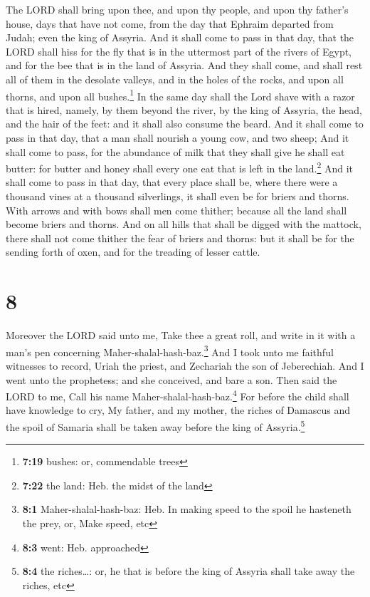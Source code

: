  The LORD shall bring upon thee, and upon thy people, and
upon thy father's house, days that have not come, from the day that
Ephraim departed from Judah; even the king of Assyria. 
And it shall come to pass in that day, that the LORD shall hiss for the
fly that is in the uttermost part of the rivers of Egypt, and for the
bee that is in the land of Assyria.  And they shall come,
and shall rest all of them in the desolate valleys, and in the holes of
the rocks, and upon all thorns, and upon all bushes.\footnote{\textbf{7:19}
  bushes: or, commendable trees}  In the same day shall
the Lord shave with a razor that is hired, namely, by them beyond the
river, by the king of Assyria, the head, and the hair of the feet: and
it shall also consume the beard.  And it shall come to
pass in that day, that a man shall nourish a young cow, and two sheep;
 And it shall come to pass, for the abundance of milk
that they shall give he shall eat butter: for butter and honey shall
every one eat that is left in the land.\footnote{\textbf{7:22} the land:
  Heb. the midst of the land}  And it shall come to pass
in that day, that every place shall be, where there were a thousand
vines at a thousand silverlings, it shall even be for briers and thorns.
 With arrows and with bows shall men come thither;
because all the land shall become briers and thorns.  And
on all hills that shall be digged with the mattock, there shall not come
thither the fear of briers and thorns: but it shall be for the sending
forth of oxen, and for the treading of lesser cattle.

\hypertarget{section-7}{%
\section{8}\label{section-7}}

 Moreover the LORD said unto me, Take thee a great roll,
and write in it with a man's pen concerning
Maher-shalal-hash-baz.\footnote{\textbf{8:1} Maher-shalal-hash-baz: Heb.
  In making speed to the spoil he hasteneth the prey, or, Make speed,
  etc}  And I took unto me faithful witnesses to record,
Uriah the priest, and Zechariah the son of Jeberechiah. 
And I went unto the prophetess; and she conceived, and bare a son. Then
said the LORD to me, Call his name Maher-shalal-hash-baz.\footnote{\textbf{8:3}
  went: Heb. approached}  For before the child shall have
knowledge to cry, My father, and my mother, the riches of Damascus and
the spoil of Samaria shall be taken away before the king of
Assyria.\footnote{\textbf{8:4} the riches\ldots: or, he that is before
  the king of Assyria shall take away the riches, etc}

